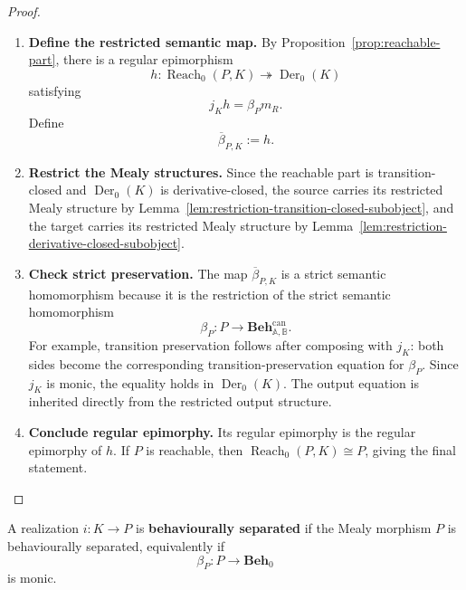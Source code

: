 \begin{proof}
    \leavevmode
    \begin{enumerate}
        \item \textbf{Define the restricted semantic map.} By Proposition~\ref{prop:reachable-part}, there is a regular epimorphism
        \[
            h:\operatorname{Reach}_0(P,K)\twoheadrightarrow\operatorname{Der}_0(K)
        \]
        satisfying
        \[
            j_Kh=\beta_Pm_R.
        \]
        Define
        \[
            \overline{\beta}_{P,K}:=h.
        \]

        \item \textbf{Restrict the Mealy structures.} Since the reachable part is transition-closed and \(\operatorname{Der}_0(K)\) is derivative-closed, the source carries its restricted Mealy structure by Lemma~\ref{lem:restriction-transition-closed-subobject}, and the target carries its restricted Mealy structure by Lemma~\ref{lem:restriction-derivative-closed-subobject}.

        \item \textbf{Check strict preservation.} The map \(\overline{\beta}_{P,K}\) is a strict semantic homomorphism because it is the restriction of the strict semantic homomorphism
        \[
            \beta_P:P\to
            \mathbf{Beh}^{\mathrm{can}}_{\mathbb A,\mathbb B}.
        \]
        For example, transition preservation follows after composing with \(j_K\): both sides become the corresponding transition-preservation equation for \(\beta_P\). Since \(j_K\) is monic, the equality holds in \(\operatorname{Der}_0(K)\). The output equation is inherited directly from the restricted output structure.

        \item \textbf{Conclude regular epimorphy.} Its regular epimorphy is the regular epimorphy of \(h\). If \(P\) is reachable, then \(\operatorname{Reach}_0(P,K)\cong P\), giving the final statement.
    \end{enumerate}
\end{proof}

\begin{definition}
\label{def:separated-realization}
    A realization \(i:K\to P\) is \textbf{behaviourally separated} if the Mealy morphism \(P\) is behaviourally separated, equivalently if
    \[
        \beta_P:P\to\mathbf{Beh}_0
    \]
    is monic.
\end{definition}

